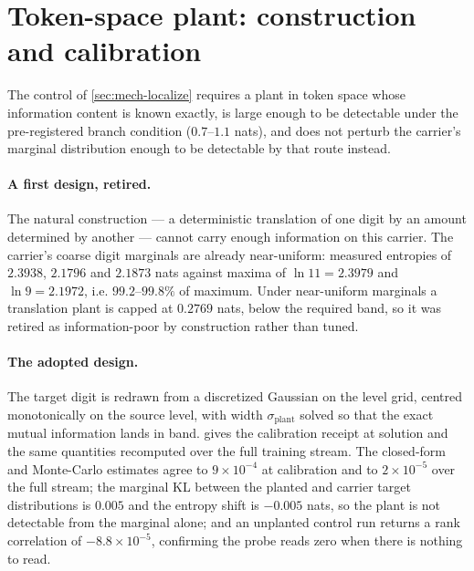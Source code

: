 \section{Token-space plant: construction and calibration}
\label{app:plant}

The control of \cref{sec:mech-localize} requires a plant in token space whose information content
is known exactly, is large enough to be detectable under the pre-registered branch condition
($0.7$--$1.1$ nats), and does not perturb the carrier's marginal distribution enough to be
detectable by that route instead.

\paragraph{A first design, retired.} The natural construction --- a deterministic translation of one
digit by an amount determined by another --- cannot carry enough information on this carrier. The
carrier's coarse digit marginals are already near-uniform: measured entropies of $2.3938$, $2.1796$
and $2.1873$ nats against maxima of $\ln 11 = 2.3979$ and $\ln 9 = 2.1972$, i.e. $99.2$--$99.8\%$ of
maximum. Under near-uniform marginals a translation plant is capped at $0.2769$ nats, below the
required band, so it was retired as information-poor by construction rather than tuned.

\paragraph{The adopted design.} The target digit is redrawn from a discretized Gaussian on the level
grid, centred monotonically on the source level, with width $\sigma_{\text{plant}}$ solved so that
the exact mutual information lands in band.  gives the calibration receipt at
solution and the same quantities recomputed over the full training stream. The closed-form and
Monte-Carlo estimates agree to $9\times10^{-4}$ at calibration and to $2\times10^{-5}$ over the full
stream; the marginal KL between the planted and carrier target distributions is $0.005$ and the
entropy shift is $-0.005$ nats, so the plant is not detectable from the marginal alone; and an
unplanted control run returns a rank correlation of $-8.8\times10^{-5}$, confirming the probe reads
zero when there is nothing to read.

